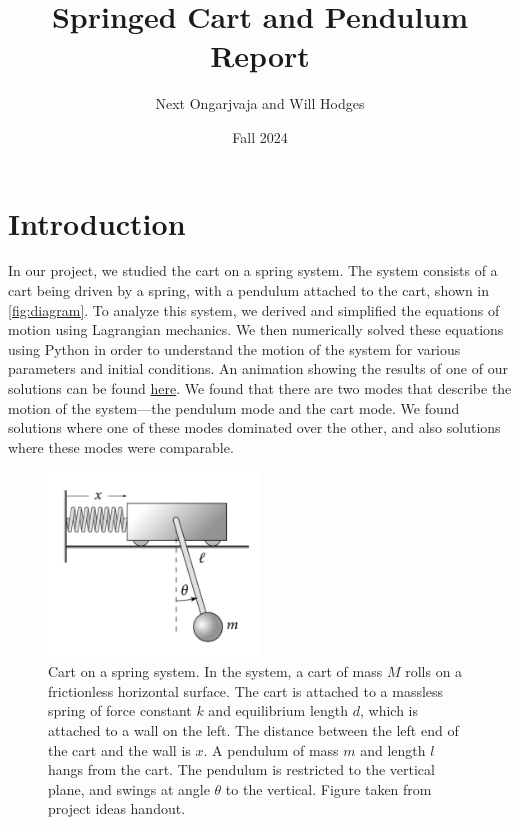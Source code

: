 \documentclass[12pt]{article}
\title{Springed Cart and Pendulum Report}
\author{Next Ongarjvaja and Will Hodges}
\date{Fall 2024}
\begin{document}
\maketitle

\section{Introduction}

In our project, we studied the cart on a spring system. The system consists of a cart being driven by a spring, with a pendulum attached to the cart, shown in \autoref{fig:diagram}. To analyze this system, we derived and simplified the equations of motion using Lagrangian mechanics. We then numerically solved these equations using Python in order to understand the motion of the system for various parameters and initial conditions. An animation showing the results of one of our solutions can be found \href{https://github.com/NextZtepS/SpringedCart_and_Pendulum/blob/main/animation.gif}{here}. We found that there are two modes that describe the motion of the system—the pendulum mode and the cart mode. We found solutions where one of these modes dominated over the other, and also solutions where these modes were comparable.

\begin{figure}
    \centering
    \includegraphics[width=0.5\textwidth]{figures/diagram.png}
    \caption{\small{Cart on a spring system. In the system, a cart of mass $M$ rolls on a frictionless horizontal surface. The cart is attached to a massless spring of force constant $k$ and equilibrium length $d$, which is attached to a wall on the left. The distance between the left end of the cart and the wall is $x$. A pendulum of mass $m$ and length $l$ hangs from the cart. The pendulum is restricted to the vertical plane, and swings at angle $\theta$ to the vertical. Figure taken from project ideas handout.}}
    \label{fig:diagram}
\end{figure}
\end{document}
